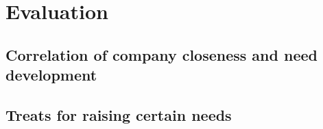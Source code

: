 \section{Evaluation}

\subsection{Correlation of company closeness and need development}

\subsection{Treats for raising certain needs}
